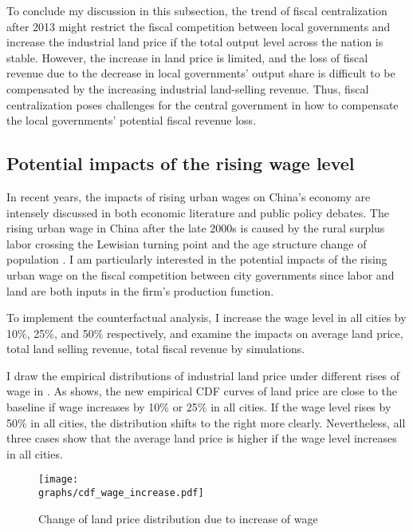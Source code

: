 To conclude my discussion in this subsection, the trend of fiscal centralization
after 2013 might restrict the fiscal competition between local governments and increase
the industrial land price if the total output level across the nation is stable.
However, the increase in land price is limited, and
the loss of fiscal revenue due to the decrease in local governments' output
share is difficult to be compensated by the increasing industrial land-selling revenue.
Thus, fiscal centralization poses challenges for the central government in how to
compensate the local governments' potential fiscal revenue loss.

\subsection{Potential impacts of the rising wage level}
In recent years, the impacts of rising urban wages on China's economy are intensely discussed in
both economic literature and public policy debates. The rising urban wage in China after the late 2000s
is caused by the rural surplus labor crossing the Lewisian turning point
\citep{cai2010growth} and the age structure change of population \citep{fang2016china}.
I am particularly interested in the potential impacts of the rising urban wage
on the fiscal competition between city governments
since labor and land are both inputs in the firm's production function.

To implement the counterfactual analysis, I increase the wage level in all cities
by 10\%, 25\%, and 50\% respectively,
and examine the impacts on average land price, total land selling revenue, total fiscal revenue
by simulations.

I draw the empirical distributions of industrial land price under different rises of wage
in . As 
shows, the new empirical CDF curves of land price
are close to the baseline if wage increases by 10\% or 25\% in all cities.
If the wage level rises by 50\% in all cities,
the distribution shifts to the right more clearly.
Nevertheless, all three cases show that the average land price is higher
if the wage level increases in all cities.

\begin{figure}[H]
    \centering
    \caption{Change of land price distribution due to increase of wage}
    \texttt{[image: \\graphs/cdf\_wage\_increase.pdf]}
    \label{fig: increase_wage}
\end{figure}

